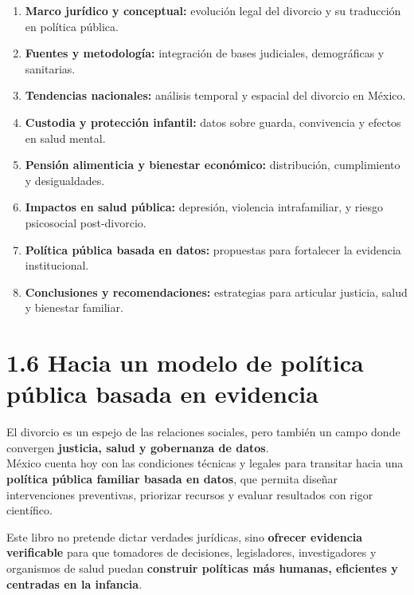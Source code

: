\documentclass[
  letterpaper,
  DIV=11,
  numbers=noendperiod]{scrreprt}
\providecommand{\tightlist}{%
  \setlength{\itemsep}{0pt}\setlength{\parskip}{0pt}}
\begin{document}
\begin{enumerate}
\def\labelenumi{\arabic{enumi}.}
\tightlist
\item
  \textbf{Marco jurídico y conceptual:} evolución legal del divorcio y
  su traducción en política pública.\\
\item
  \textbf{Fuentes y metodología:} integración de bases judiciales,
  demográficas y sanitarias.\\
\item
  \textbf{Tendencias nacionales:} análisis temporal y espacial del
  divorcio en México.\\
\item
  \textbf{Custodia y protección infantil:} datos sobre guarda,
  convivencia y efectos en salud mental.\\
\item
  \textbf{Pensión alimenticia y bienestar económico:} distribución,
  cumplimiento y desigualdades.\\
\item
  \textbf{Impactos en salud pública:} depresión, violencia
  intrafamiliar, y riesgo psicosocial post-divorcio.\\
\item
  \textbf{Política pública basada en datos:} propuestas para fortalecer
  la evidencia institucional.\\
\item
  \textbf{Conclusiones y recomendaciones:} estrategias para articular
  justicia, salud y bienestar familiar.
\end{enumerate}


\chapter{1.6 Hacia un modelo de política pública basada en
evidencia}\label{hacia-un-modelo-de-poluxedtica-puxfablica-basada-en-evidencia}

El divorcio es un espejo de las relaciones sociales, pero también un
campo donde convergen \textbf{justicia, salud y gobernanza de datos}.\\
México cuenta hoy con las condiciones técnicas y legales para transitar
hacia una \textbf{política pública familiar basada en datos}, que
permita diseñar intervenciones preventivas, priorizar recursos y evaluar
resultados con rigor científico.

Este libro no pretende dictar verdades jurídicas, sino \textbf{ofrecer
evidencia verificable} para que tomadores de decisiones, legisladores,
investigadores y organismos de salud puedan \textbf{construir políticas
más humanas, eficientes y centradas en la infancia}.
\end{document}

